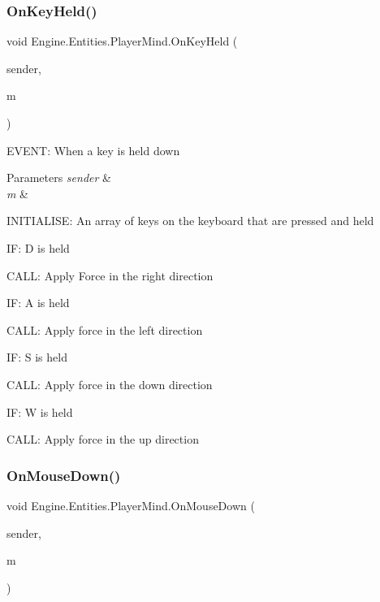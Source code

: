 \subsubsection{\texorpdfstring{On\+Key\+Held()}{OnKeyHeld()}}
{\footnotesize\ttfamily void Engine.\+Entities.\+Player\+Mind.\+On\+Key\+Held (\begin{DoxyParamCaption}\item[{object}]{sender,  }\item[{\hyperlink{a00362}{Key\+Event\+Args}}]{m }\end{DoxyParamCaption})\hspace{0.3cm}{\ttfamily [inline]}}



E\+V\+E\+NT\+: When a key is held down 


\begin{DoxyParams}{Parameters}
{\em sender} & \\
\hline
{\em m} & \\
\hline
\end{DoxyParams}
I\+N\+I\+T\+I\+A\+L\+I\+SE\+: An array of keys on the keyboard that are pressed and held

IF\+: D is held

C\+A\+LL\+: Apply Force in the right direction

IF\+: A is held

C\+A\+LL\+: Apply force in the left direction

IF\+: S is held

C\+A\+LL\+: Apply force in the down direction

IF\+: W is held

C\+A\+LL\+: Apply force in the up direction \mbox{\label{a00326_a25869d97c0416cc348d589fb423b9d05}} 
\subsubsection{\texorpdfstring{On\+Mouse\+Down()}{OnMouseDown()}}
{\footnotesize\ttfamily void Engine.\+Entities.\+Player\+Mind.\+On\+Mouse\+Down (\begin{DoxyParamCaption}\item[{object}]{sender,  }\item[{\hyperlink{a00374}{Mouse\+Event\+Args}}]{m }\end{DoxyParamCaption})\hspace{0.3cm}{\ttfamily [inline]}}



